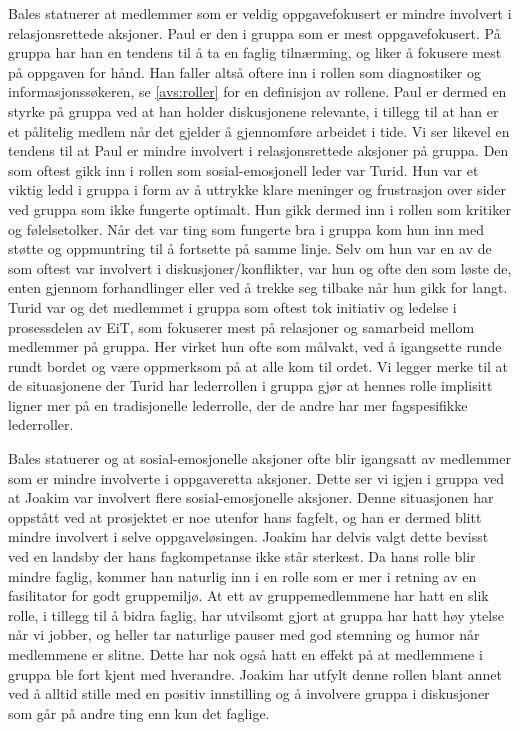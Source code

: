 Bales statuerer at medlemmer som er veldig oppgavefokusert er mindre involvert i 
relasjonsrettede aksjoner. Paul er den i gruppa som er mest oppgavefokusert. 
På gruppa har han en tendens til å ta en faglig tilnærming, og liker å fokusere mest 
på oppgaven for hånd. Han faller altså oftere inn i rollen som diagnostiker og 
informasjonssøkeren, se \cref{avs:roller} for en definisjon av rollene. Paul er dermed en styrke på gruppa ved at han holder 
diskusjonene relevante, i tillegg til at han er et pålitelig medlem når det gjelder 
å gjennomføre arbeidet i tide. Vi ser likevel en tendens til at Paul er mindre involvert 
i relasjonsrettede aksjoner på gruppa. 
Den som oftest gikk inn i rollen som sosial-emosjonell leder var Turid. Hun var et viktig 
ledd i gruppa i form av å uttrykke klare meninger og frustrasjon over sider ved gruppa
som ikke fungerte optimalt. Hun gikk dermed inn i rollen som kritiker og følelsetolker.
Når det var ting som fungerte bra i gruppa kom hun inn med støtte og oppmuntring til å 
fortsette på samme linje. Selv om hun var en av de som oftest var involvert i diskusjoner/konflikter,
var hun og ofte den som løste de, enten gjennom forhandlinger eller ved å trekke seg tilbake
når hun gikk for langt. Turid var og det medlemmet i gruppa som oftest tok initiativ og ledelse 
i prosessdelen av EiT, som fokuserer mest på relasjoner og samarbeid mellom medlemmer på gruppa. 
Her virket hun ofte som målvakt, ved å igangsette runde rundt bordet og være oppmerksom på 
at alle kom til ordet. Vi legger merke til at de situasjonene der Turid har
lederrollen i gruppa gjør at hennes rolle implisitt ligner mer på en tradisjonelle lederrolle, der de
andre har mer fagspesifikke lederroller. 

Bales statuerer og at sosial-emosjonelle aksjoner ofte blir igangsatt av medlemmer som er 
mindre involverte i oppgaveretta aksjoner. Dette ser vi igjen i gruppa ved at Joakim var 
involvert flere sosial-emosjonelle aksjoner. Denne situasjonen har oppstått ved at prosjektet 
er noe utenfor hans fagfelt, og han er dermed blitt mindre involvert i selve oppgaveløsingen. 
Joakim har delvis valgt dette bevisst ved en landsby der hans fagkompetanse ikke
står sterkest. Da hans rolle blir mindre faglig, kommer han naturlig inn i en
rolle som er mer i retning av en fasilitator for godt gruppemiljø. At ett av
gruppemedlemmene har hatt en slik rolle, i tillegg til å bidra faglig, har
utvilsomt gjort at gruppa har hatt høy ytelse når vi jobber, og heller tar
naturlige pauser med god stemning og humor når medlemmene er slitne. Dette har
nok også hatt en effekt på at medlemmene i gruppa ble fort kjent med hverandre.
Joakim har utfylt denne rollen blant annet ved å alltid stille med en positiv innstilling og 
å involvere gruppa i diskusjoner som går på andre ting enn kun det faglige.


